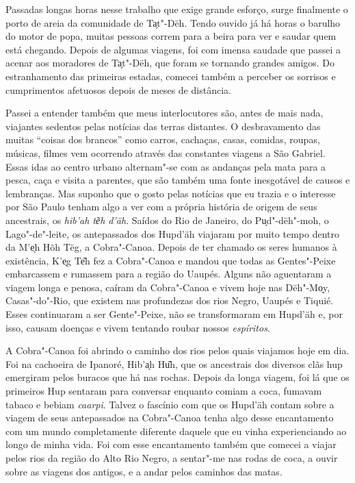 Passadas longas horas nesse trabalho que exige grande esforço, surge
finalmente o porto de areia da comunidade de Ta̗t"-Dëh. Tendo ouvido já
há horas o barulho do motor de popa, muitas pessoas correm para a beira
para ver e saudar quem está chegando. Depois de algumas viagens, foi com
imensa saudade que passei a acenar aos moradores de Ta̗t"-Dëh, que foram
se tornando grandes amigos. Do estranhamento das primeiras estadas,
comecei também a perceber os sorrisos e cumprimentos afetuosos depois de
meses de distância.

Passei a entender também que meus interlocutores são, antes de mais
nada, viajantes sedentos pelas notícias das terras distantes. O
desbravamento das muitas ``coisas dos brancos'' como carros, cachaças,
casas, comidas, roupas, músicas, filmes vem ocorrendo através das
constantes viagens a São Gabriel. Essas idas ao centro urbano
alternam"-se com as andanças pela mata para a pesca, caça e visita a
parentes, que são também uma fonte inesgotável de causos e lembranças.
Mas suponho que o gosto pelas notícias que eu trazia e o interesse por
São Paulo tenham algo a ver com a própria história de origem de seus
ancestrais, os \textit{hib'ah te͂h d'äh}. Saídos do Rio de Janeiro, do
Pu̗d"-dëh"-moh, o Lago"-de"-leite, os antepassados dos Hupd'äh viajaram
por muito tempo dentro da M'e̖h Hõh Tëg, a Cobra"-Canoa. Depois de
ter chamado os seres humanos à existência, K'e̖g Te͂h fez a Cobra"-Canoa
e mandou que todas as Gentes"-Peixe embarcassem e rumassem para a região
do Uaupés. Alguns não aguentaram a viagem longa e penosa, caíram da
Cobra"-Canoa e vivem hoje nas Dëh"-Mo̖y, Casas"-do"-Rio, que existem
nas profundezas dos rios Negro, Uaupés e Tiquié. Esses continuaram a ser
Gente"-Peixe, não se transformaram em Hupd'äh e, por isso, causam doenças
e vivem tentando roubar nossos \textit{espíritos}.

A Cobra"-Canoa foi abrindo o caminho dos rios pelos quais viajamos hoje
em dia. Foi na cachoeira de Ipanoré, Hib'a̖h Hu͂h, que os ancestrais dos
diversos clãs hup emergiram pelos buracos que há nas rochas. Depois da
longa viagem, foi lá que os primeiros Hup sentaram para conversar
enquanto comiam a coca, fumavam tabaco e bebiam \textit{caarpi}. Talvez o
fascínio com que os Hupd'äh contam sobre a viagem de seus antepassados
na Cobra"-Canoa tenha algo desse encantamento com um mundo completamente
diferente daquele que eu vinha experienciando ao longo de minha vida.
Foi com esse encantamento também que comecei a viajar pelos rios da
região do Alto Rio Negro, a sentar"-me nas rodas de coca, a ouvir sobre
as viagens dos antigos, e a andar pelos caminhos das matas.

